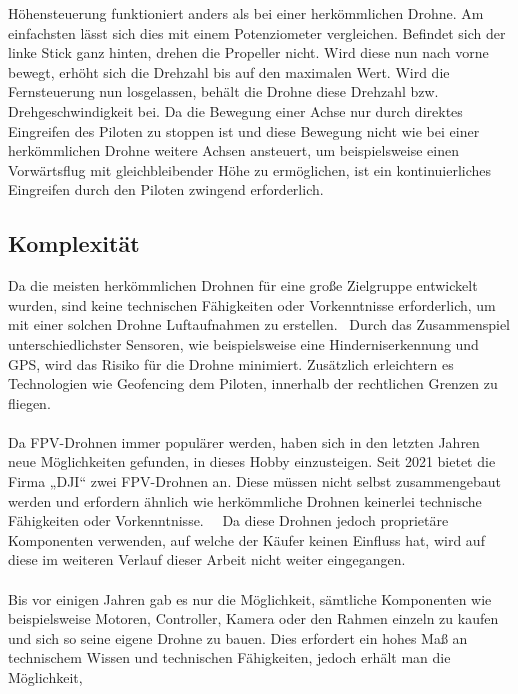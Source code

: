         Höhensteuerung funktioniert anders als bei einer herkömmlichen Drohne. Am einfachsten lässt sich dies mit
        einem Potenziometer vergleichen. Befindet sich der linke Stick ganz hinten, drehen die Propeller nicht.
        Wird diese nun nach vorne bewegt, erhöht sich die Drehzahl bis auf den maximalen Wert. Wird die Fernsteuerung
        nun losgelassen, behält die Drohne diese Drehzahl bzw. Drehgeschwindigkeit bei. Da die Bewegung einer Achse
        nur durch direktes Eingreifen des Piloten zu stoppen ist und diese Bewegung nicht wie bei einer herkömmlichen
        Drohne weitere Achsen ansteuert, um beispielsweise einen Vorwärtsflug mit gleichbleibender Höhe zu ermöglichen,
        ist ein kontinuierliches Eingreifen durch den Piloten zwingend erforderlich.
        
    \newpage       
    \subsection[Komplexität]{Komplexität}
        Da die meisten herkömmlichen Drohnen für eine große Zielgruppe entwickelt wurden, sind keine technischen
        Fähigkeiten oder Vorkenntnisse erforderlich, um mit einer solchen Drohne Luftaufnahmen zu erstellen.~\cite{shon2022}
        Durch das Zusammenspiel unterschiedlichster Sensoren, wie beispielsweise eine Hinderniserkennung und GPS,
        wird das Risiko für die Drohne minimiert. Zusätzlich erleichtern es Technologien wie Geofencing dem Piloten,
        innerhalb der rechtlichen Grenzen zu fliegen. \\
        \\
        Da FPV-Drohnen immer populärer werden, haben sich in den letzten Jahren neue Möglichkeiten gefunden, in
        dieses Hobby einzusteigen. Seit 2021 bietet die Firma „DJI“ zwei FPV-Drohnen an. Diese müssen nicht selbst
        zusammengebaut werden und erfordern ähnlich wie herkömmliche Drohnen keinerlei technische Fähigkeiten oder
        Vorkenntnisse.~\cite{DJIAvatar}~\cite{DJIFpv} Da diese Drohnen jedoch proprietäre Komponenten verwenden, auf welche der Käufer keinen Einfluss
        hat, wird auf diese im weiteren Verlauf dieser Arbeit nicht weiter eingegangen. \\
        \\
        Bis vor einigen Jahren gab es nur die Möglichkeit, sämtliche Komponenten wie beispielsweise Motoren,
        Controller, Kamera oder den Rahmen einzeln zu kaufen und sich so seine eigene Drohne zu bauen. Dies
        erfordert ein hohes Maß an technischem Wissen und technischen Fähigkeiten, jedoch erhält man die Möglichkeit,
